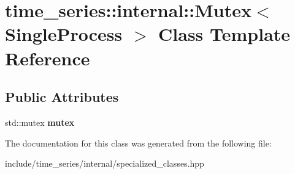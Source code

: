\hypertarget{classtime__series_1_1internal_1_1Mutex_3_01SingleProcess_01_4}{}\section{time\+\_\+series\+:\+:internal\+:\+:Mutex$<$ Single\+Process $>$ Class Template Reference}
\label{classtime__series_1_1internal_1_1Mutex_3_01SingleProcess_01_4}
\subsection*{Public Attributes}
\begin{DoxyCompactItemize}
\item 
std\+::mutex {\bfseries mutex}\hypertarget{classtime__series_1_1internal_1_1Mutex_3_01SingleProcess_01_4_a5f39c59650dd603cc102dbbc15f82d51}{}\label{classtime__series_1_1internal_1_1Mutex_3_01SingleProcess_01_4_a5f39c59650dd603cc102dbbc15f82d51}

\end{DoxyCompactItemize}


The documentation for this class was generated from the following file\+:\begin{DoxyCompactItemize}
\item 
include/time\+\_\+series/internal/specialized\+\_\+classes.\+hpp\end{DoxyCompactItemize}
